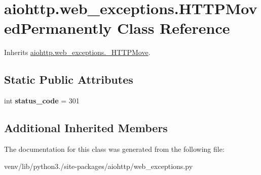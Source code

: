 \hypertarget{classaiohttp_1_1web__exceptions_1_1_h_t_t_p_moved_permanently}{}\section{aiohttp.\+web\+\_\+exceptions.\+H\+T\+T\+P\+Moved\+Permanently Class Reference}
\label{classaiohttp_1_1web__exceptions_1_1_h_t_t_p_moved_permanently}


Inherits \hyperlink{classaiohttp_1_1web__exceptions_1_1___h_t_t_p_move}{aiohttp.\+web\+\_\+exceptions.\+\_\+\+H\+T\+T\+P\+Move}.

\subsection*{Static Public Attributes}
\begin{DoxyCompactItemize}
\item 
\mbox{\label{classaiohttp_1_1web__exceptions_1_1_h_t_t_p_moved_permanently_a615ad7efb7e798d6af96c22b52261fc5}} 
int {\bfseries status\+\_\+code} = 301
\end{DoxyCompactItemize}
\subsection*{Additional Inherited Members}


The documentation for this class was generated from the following file\+:\begin{DoxyCompactItemize}
\item 
venv/lib/python3./site-\/packages/aiohttp/web\+\_\+exceptions.\+py\end{DoxyCompactItemize}
